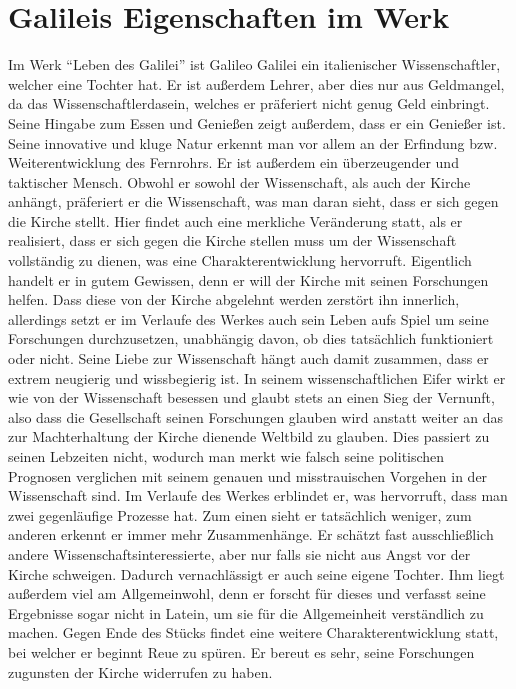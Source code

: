 \documentclass[12pt]{scrreprt}
\begin{document}
\section{Galileis Eigenschaften im Werk}
	\label{sec:galileis eigenschaften im werk}
Im Werk \enquote{Leben des Galilei} ist Galileo Galilei ein italienischer Wissenschaftler, welcher eine Tochter hat.
Er ist außerdem Lehrer, aber dies nur aus Geldmangel, da das Wissenschaftlerdasein, welches er präferiert nicht genug Geld einbringt.
Seine Hingabe zum Essen und Genießen zeigt außerdem, dass er ein Genießer ist.
Seine innovative und kluge Natur erkennt man vor allem an der Erfindung bzw. Weiterentwicklung des Fernrohrs.
Er ist außerdem ein überzeugender und taktischer Mensch.
Obwohl er sowohl der Wissenschaft, als auch der Kirche anhängt, präferiert er die Wissenschaft, was man daran sieht, dass er sich gegen die Kirche stellt. 
Hier findet auch eine merkliche Veränderung statt, als er realisiert, dass er sich gegen die Kirche stellen muss um der Wissenschaft vollständig zu dienen, was eine Charakterentwicklung hervorruft.
Eigentlich handelt er in gutem Gewissen, denn er will der Kirche mit seinen Forschungen helfen.
Dass diese von der Kirche abgelehnt werden zerstört ihn innerlich, allerdings setzt er im Verlaufe des Werkes auch sein Leben aufs Spiel um seine Forschungen durchzusetzen, unabhängig davon, ob dies tatsächlich funktioniert oder nicht.
Seine Liebe zur Wissenschaft hängt auch damit zusammen, dass er extrem neugierig und wissbegierig ist.
In seinem wissenschaftlichen Eifer wirkt er wie von der Wissenschaft besessen und glaubt stets an einen Sieg der Vernunft, also dass die Gesellschaft seinen Forschungen glauben wird anstatt weiter an das zur Machterhaltung der Kirche dienende Weltbild zu glauben.
Dies passiert zu seinen Lebzeiten nicht, wodurch man merkt wie falsch seine politischen Prognosen verglichen mit seinem genauen und misstrauischen Vorgehen in der Wissenschaft sind.
Im Verlaufe des Werkes erblindet er, was hervorruft, dass man zwei gegenläufige Prozesse hat. 
Zum einen sieht er tatsächlich weniger, zum anderen erkennt er immer mehr Zusammenhänge.
Er schätzt fast ausschließlich andere Wissenschaftsinteressierte, aber nur falls sie nicht aus Angst vor der Kirche schweigen.
Dadurch vernachlässigt er auch seine eigene Tochter.
Ihm liegt außerdem viel am Allgemeinwohl, denn er forscht für dieses und verfasst seine Ergebnisse sogar nicht in Latein, um sie für die Allgemeinheit verständlich zu machen.
Gegen Ende des Stücks findet eine weitere Charakterentwicklung statt, bei welcher er beginnt Reue zu spüren.
Er bereut es sehr, seine Forschungen zugunsten der Kirche widerrufen zu haben.
\autocite{wiki:Leben_des_Galilei}
\autocite{wiki:Leben_des_Galilei_Charakterisierungen}
\autocite{wiki:Leben_des_Galilei_Studysmarter}
\autocite{wiki:Leben_des_Galilei_Personen}
\end{document}
